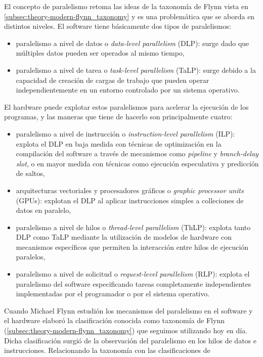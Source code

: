 El concepto de paralelismo retoma las ideas de la taxonomía de Flynn vista en 
\ref{subsec:theory-modern-flynn_taxonomy} y es una problemática que se aborda 
en distintos niveles. El software tiene básicamente dos tipos de paralelismos:
\begin{itemize}
  \item paralelismo a nivel de datos o \emph{data-level parallelism} (DLP): 
surge dado que múltiples datos pueden ser operados al mismo tiempo,
  \item paralelismo a nivel de tarea o \emph{task-level parallelism} (TaLP): 
surge debido a la capacidad de creación de cargas de trabajo que pueden operar 
independientemente en un entorno controlado por un sistema operativo.
\end{itemize}
El hardware puede explotar estos paralelismos para acelerar la ejecución de los 
programas, y las maneras que tiene de hacerlo son principalmente cuatro:
\begin{itemize}
  \item paralelismo a nivel de instrucción o \emph{instruction-level 
parallelism} (ILP): explota el DLP en baja medida con técnicas de optimización 
en la compilación del software a través de mecanismos como \emph{pipeline} y 
\emph{branch-delay slot}, o en mayor medida con técnicas como ejecución 
especulativa y predicción de saltos,
  \item arquitecturas vectoriales y procesadores gráficos o \emph{graphic 
processor units} (GPUs): explotan el DLP al aplicar instrucciones simples a 
colleciones de datos en paralelo,
  \item paralelismo a nivel de hilos o \emph{thread-level parallelism} (ThLP): 
explota tanto DLP como TaLP mediante la utilización de modelos de hardware con 
mecanismos específicos que permiten la interacción entre hilos de ejecución 
paralelos,
  \item paralelismo a nivel de solicitud o \emph{request-level parallelism} 
(RLP): explota el paralelismo del software especificando tareas completamente 
independientes implementadas por el programador o por el sistema operativo.
\end{itemize}
Cuando Michael Flynn estudión los mecanismos del paralelismo en el software y 
el hardware elaboró la clasificación conocida como taxonomía de Flynn 
(\ref{subsec:theory-modern-flynn_taxonomy}) que seguimos utilizando hoy en día. 
Dicha clasificación surgió de la observación del paralelismo en los hilos de 
datos e instrucciones. Relacionando la taxonomía con las clasificaciones de 
